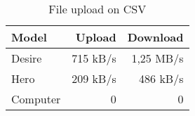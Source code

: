 \begin{table}
  \centering
  \caption{File upload on CSV}
  \begin{tabular}{ | l | r | r |}
    \hline
    \textbf{Model}    &   \textbf{Upload}  &   \textbf{Download}   \\ \hline
    Desire   &   715 kB/s & 1,25 MB/s   \\ \hline                
    Hero     &   209 kB/s & 486 kB/s    \\ \hline 
    Computer & 0 & 0 \\ \hline
  \end{tabular}
  \label{tbl:files:encrypted}
\end{table}
